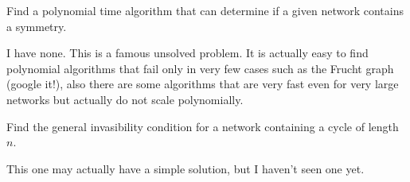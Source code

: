 Find a polynomial time algorithm that can determine if a given network contains a symmetry.

\solution 
I have none. This is a famous unsolved problem. It is actually easy to find polynomial algorithms that fail only in very few cases such as the Frucht graph (google it!), also there are some algorithms that are very fast even for very large networks but actually do not scale polynomially. 

Find the general invasibility condition for a network containing a cycle of length $n$. 

\solution
This one may actually have a simple solution, but I haven't seen one yet. 

